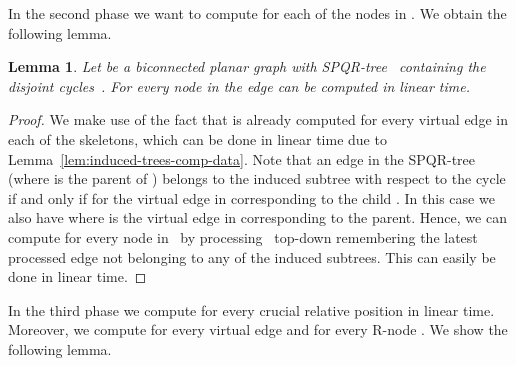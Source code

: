 \documentclass{scrartcl}
\newcommand{\1}[1]{{\normalfont \ensuremath{#1^{\tiny\circled{1}}}}} \newcommand{\2}[1]{{\normalfont \ensuremath{#1^{\tiny\circled{2}}}}} \renewcommand{\k}[1]{{\normalfont \ensuremath{#1^{\tiny\circled{k}}}}} \newcommand{\proj}[2]{\ensuremath{\left.#1\right|_{#2}}} \newcommand{\eps}{\varepsilon}
\theoremstyle{plain} \newtheorem{theorem}{Theorem} \newcounter{lemmacounter} \setcounter{lemmacounter}{0} \newtheorem{lemma}[lemmacounter]{Lemma} \newtheorem{fact}{Fact}  \newtheorem{corollary}{Corollary} \theoremstyle{definition} \newtheorem{definition}{Definition}
\begin{document}
In the second phase we want to compute  for each of the
nodes in .  We obtain the following lemma.

\begin{lemma}
  \label{lem:computing-high}
  Let  be a biconnected planar graph with SPQR-tree~
  containing the disjoint cycles~.  For every node 
  in  the edge  can be computed in linear
  time.
\end{lemma}
\begin{proof}
  We make use of the fact that  is already computed for
  every virtual edge  in each of the skeletons, which can be
  done in linear time due to Lemma~\ref{lem:induced-trees-comp-data}.
  Note that an edge  in the SPQR-tree 
  (where  is the parent of ) belongs to the induced subtree
   with respect to the cycle 
  if and only if  for the virtual edge  in
   corresponding to the child .  In this case we
  also have  where  is the
  virtual edge in  corresponding to the parent.  Hence,
  we can compute  for every node  in~ by
  processing~ top-down remembering the latest processed
  edge not belonging to any of the induced subtrees.  This can easily
  be done in linear time.
\end{proof}

In the third phase we compute  for every crucial
relative position in linear time.  Moreover, we compute 
for every virtual edge  and  for every R-node
.  We show the following lemma.
\end{document}
